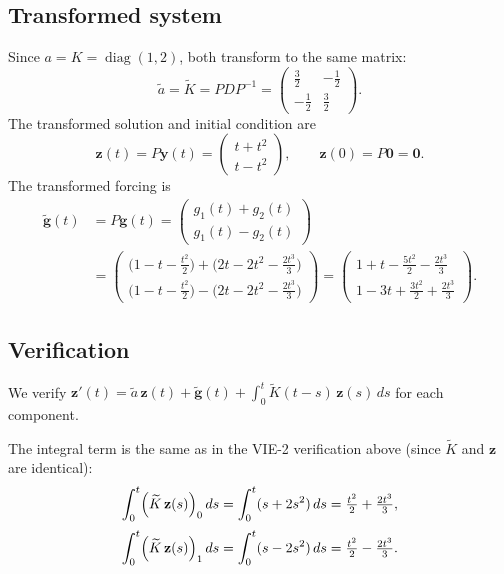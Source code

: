 \documentclass[11pt]{article}
\begin{document}
\subsection*{Transformed system}

Since $a = K = \operatorname{diag}(1,2)$, both transform to the same matrix:
\[
  \widetilde{a} = \widetilde{K}
  = PDP^{-1}
  = \begin{pmatrix}\tfrac{3}{2}&-\tfrac{1}{2}\\-\tfrac{1}{2}&\tfrac{3}{2}\end{pmatrix}.
\]
The transformed solution and initial condition are
\[
  \mathbf{z}(t) = P\mathbf{y}(t)
  = \begin{pmatrix}t+t^2\\t-t^2\end{pmatrix},
  \qquad
  \mathbf{z}(0) = P\mathbf{0} = \mathbf{0}.
\]
The transformed forcing is
\begin{align*}
  \widetilde{\mathbf{g}}(t) &= P\mathbf{g}(t)
  = \begin{pmatrix}
      g_1(t)+g_2(t)\\g_1(t)-g_2(t)
    \end{pmatrix} \\[6pt]
  &= \begin{pmatrix}
      \bigl(1-t-\tfrac{t^2}{2}\bigr)+\bigl(2t-2t^2-\tfrac{2t^3}{3}\bigr)\\[4pt]
      \bigl(1-t-\tfrac{t^2}{2}\bigr)-\bigl(2t-2t^2-\tfrac{2t^3}{3}\bigr)
    \end{pmatrix}
  = \begin{pmatrix}
      1+t-\tfrac{5t^2}{2}-\tfrac{2t^3}{3}\\[4pt]
      1-3t+\tfrac{3t^2}{2}+\tfrac{2t^3}{3}
    \end{pmatrix}.
\end{align*}

\subsection*{Verification}

We verify $\mathbf{z}'(t) = \widetilde{a}\,\mathbf{z}(t) + \widetilde{\mathbf{g}}(t)
+ \int_0^t\widetilde{K}(t-s)\,\mathbf{z}(s)\,ds$ for each component.

The integral term is the same as in the VIE-2 verification above (since
$\widetilde{K}$ and $\mathbf{z}$ are identical):
\[
  \int_0^t\Bigl(\widetilde{K}\,\mathbf{z}(s)\Bigr)_0\,ds
  = \int_0^t(s+2s^2)\,ds = \tfrac{t^2}{2}+\tfrac{2t^3}{3},
\]
\[
  \int_0^t\Bigl(\widetilde{K}\,\mathbf{z}(s)\Bigr)_1\,ds
  = \int_0^t(s-2s^2)\,ds = \tfrac{t^2}{2}-\tfrac{2t^3}{3}.
\]
\end{document}
